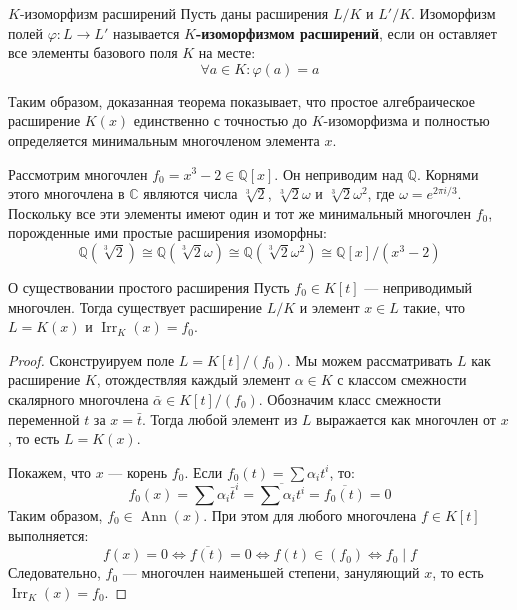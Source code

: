 \begin{Definition}{$K$-изоморфизм расширений}{}
	Пусть даны расширения $L/K$ и $L'/K$. Изоморфизм полей $\varphi: L \to L'$ называется \textbf{$K$-изоморфизмом расширений}, если он оставляет все элементы базового поля $K$ на месте:
	\[ \forall a \in K: \varphi(a) = a \]
\end{Definition}

Таким образом, доказанная теорема показывает, что простое алгебраическое расширение $K(x)$ единственно с точностью до $K$-изоморфизма и полностью определяется минимальным многочленом элемента $x$.

\begin{Example}{}{}
	Рассмотрим многочлен $f_0 = x^3 - 2 \in \mathbb{Q}[x]$. Он неприводим над $\mathbb{Q}$.
	Корнями этого многочлена в $\mathbb{C}$ являются числа $\sqrt[3]{2}$, $\sqrt[3]{2}\omega$ и $\sqrt[3]{2}\omega^2$, где $\omega = e^{2\pi i / 3}$.
	Поскольку все эти элементы имеют один и тот же минимальный многочлен $f_0$, порожденные ими простые расширения изоморфны:
	\[ \mathbb{Q}(\sqrt[3]{2}) \cong \mathbb{Q}(\sqrt[3]{2}\omega) \cong \mathbb{Q}(\sqrt[3]{2}\omega^2) \cong \mathbb{Q}[x]/(x^3 - 2) \]
\end{Example}

\begin{Theorem}{О существовании простого расширения}{}
	Пусть $f_0 \in K[t]$ --- неприводимый многочлен. Тогда существует расширение $L/K$ и элемент $x \in L$ такие, что $L = K(x)$ и $\operatorname{Irr}_K(x) = f_0$.
\end{Theorem}

\begin{proof}
	Сконструируем поле $L = K[t]/(f_0)$. Мы можем рассматривать $L$ как расширение $K$, отождествляя каждый элемент $\alpha \in K$ с классом смежности скалярного многочлена $\bar{\alpha} \in K[t]/(f_0)$.
	Обозначим класс смежности переменной $t$ за $x = \bar{t}$. Тогда любой элемент из $L$ выражается как многочлен от $x$, то есть $L = K(x)$.
	
	Покажем, что $x$ --- корень $f_0$. Если $f_0(t) = \sum \alpha_i t^i$, то:
	\[ f_0(x) = \sum \alpha_i \bar{t}^i = \overline{\sum \alpha_i t^i} = \overline{f_0(t)} = 0 \]
	Таким образом, $f_0 \in \operatorname{Ann}(x)$. При этом для любого многочлена $f \in K[t]$ выполняется:
	\[ f(x) = 0 \iff \overline{f(t)} = 0 \iff f(t) \in (f_0) \iff f_0 \mid f \]
	Следовательно, $f_0$ --- многочлен наименьшей степени, зануляющий $x$, то есть $\operatorname{Irr}_K(x) = f_0$.
\end{proof}

